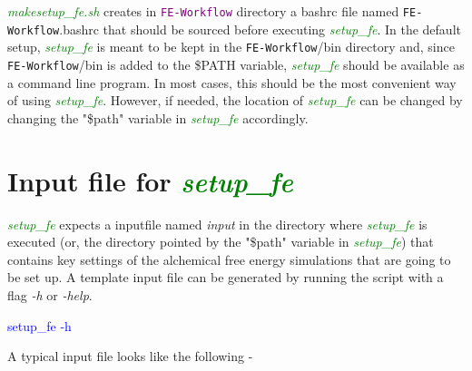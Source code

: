 \documentclass[11pt,letterpaper,titlepage]{article}
\newcommand{\wf}{\texttt{FE-Workflow}}
\begin{document}
\textcolor{green}{\textit{makesetup\_fe.sh}} creates in \textcolor{purple}{\wf{}} 
directory a bashrc file named \wf{}.bashrc that should be sourced before executing 
\textcolor{green}{\textit{setup\_fe}}.  
In the default setup, 
\textcolor{green}{\textit{setup\_fe}}
is meant to be kept in the \wf{}/bin directory and, since \wf{}/bin is added to the \$PATH variable, 
\textcolor{green}{\textit{setup\_fe}} should be available as a command line program. In most 
cases, this should be the most convenient way of using \textcolor{green}{\textit{setup\_fe}}. 
However, if needed,
the location of \textcolor{green}{\textit{setup\_fe}} can be changed by changing 
the  "\$path" variable in \textcolor{green}{\textit{setup\_fe}} accordingly.


\vspace{0.1cm}
\section{Input file for \textcolor{green}{\textit{setup\_fe}}}
\vspace{0.1cm}

\textcolor{green}{\textit{setup\_fe}} expects a inputfile named \textit{input} in the directory 
where \textcolor{green}{\textit{setup\_fe}} is executed (or, the directory pointed by the
"\$path" variable in \textcolor{green}{\textit{setup\_fe}}) that contains key settings of the
alchemical free energy simulations that are going to be set up. A template input file can be
generated by running the script with a flag \textit{-h} or \textit{-help}.

\vspace{0.1cm}
\centerline{\textcolor{blue}{setup\_fe -h}}
\vspace{0.1cm}

A typical input file looks like the
following -
\end{document}
